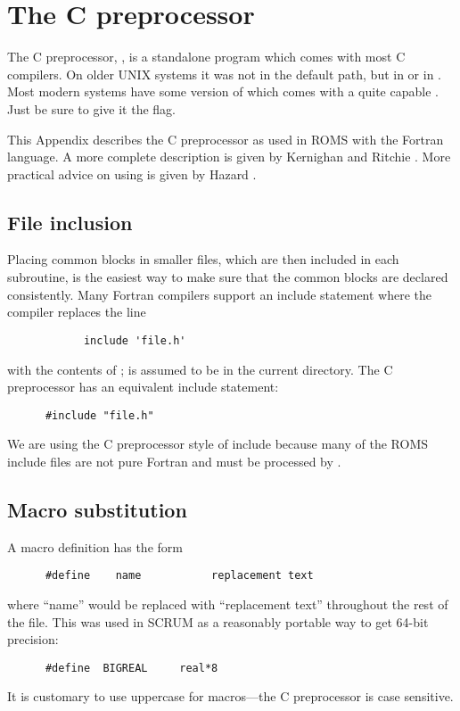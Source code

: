 \section{The C preprocessor}
\label{Cpp}

The C preprocessor, , is a standalone program which comes
with most C compilers. On older UNIX systems it was not in the default
path, but in  or in . Most modern systems
have some version of  which comes with a quite capable
. Just be sure to give it the  flag.

This Appendix describes the C preprocessor as used in ROMS with the
Fortran language.  A more complete description is given by
Kernighan and Ritchie \cite{K&R}.  More practical advice on using
 is given by Hazard \cite{Hazard}.

\subsection{File inclusion}
Placing common blocks in smaller files, which are then included in each
subroutine, is the easiest way to make sure that the common blocks are
declared consistently.  Many Fortran compilers support an include
statement where the compiler replaces the line
\begin{verbatim}
            include 'file.h'
\end{verbatim}
with the contents of ;  is assumed
to be in the current directory.  The C preprocessor has an equivalent
include statement:
\begin{verbatim}
      #include "file.h"
\end{verbatim}
We are using the C preprocessor style of include because many of the
ROMS include files are not pure Fortran and must be processed by
.

\subsection{Macro substitution}
A macro definition has the form
\begin{verbatim}
      #define    name           replacement text
\end{verbatim}
where ``name'' would be replaced with ``replacement text''
throughout the rest of the file.  This was used in SCRUM as a
reasonably portable way to get 64-bit precision:
\begin{verbatim}
      #define  BIGREAL     real*8
\end{verbatim}
It is customary to use uppercase for  macros---the C
preprocessor is case sensitive.

